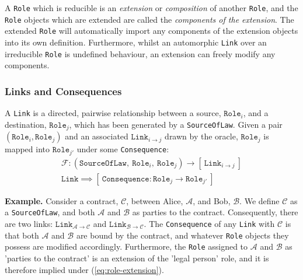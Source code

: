 \documentclass{article}
\numberwithin{equation}{section}
\newcommand{\quickexample}[1]{
\begin{tcolorbox}
	\textbf{Example.} #1
\end{tcolorbox}
}
\begin{document}
A \texttt{Role} which is reducible is an \textit{extension} or \textit{composition} of another \texttt{Role}, and the \texttt{Role} objects which are extended are called the \textit{components of the extension}. The extended \texttt{Role} will automatically import any components of the extension objects into its own definition. Furthermore, whilst an automorphic \texttt{Link} over an irreducible \texttt{Role} is undefined behaviour, an extension can freely modify any components.


\subsubsection{Links and Consequences}\label{section:links-and-consequences}

A \texttt{Link} is a directed, pairwise relationship between a source, $\texttt{Role}_i$, and a destination, $\texttt{Role}_j$, which has been generated by a \texttt{SourceOfLaw}. Given a pair $(\texttt{Role}_i, \texttt{Role}_j)$ and an associated $\texttt{Link}_{i \rightarrow j}$ drawn by the oracle, $\texttt{Role}_j$ is mapped into $\texttt{Role}_{j'}$ under some \texttt{Consequence}:
\begin{align}\label{eq:role-extension}
	\mathcal{F} : (\texttt{SourceOfLaw}, \ \texttt{Role}_i, \ \texttt{Role}_j) \rightarrow [ \ \texttt{Link}_{i \rightarrow j} \ ] \\
	\texttt{Link} \implies [ \ \texttt{Consequence} : \texttt{Role}_j \rightarrow \texttt{Role}_{j'} \ ]
\end{align}

\vspace{0.25cm}
\quickexample{
	Consider a contract, $\mathcal{C}$, between Alice, $\mathcal{A}$, and Bob, $\mathcal{B}$. We define $\mathcal{C}$ as a \texttt{SourceOfLaw}, and both $\mathcal{A}$ and $\mathcal{B}$ as parties to the contract. Consequently, there are two links: $\texttt{Link}_{\mathcal{A} \rightarrow \mathcal{C}}$ and $\texttt{Link}_{\mathcal{B} \rightarrow \mathcal{C}}$. The \texttt{Consequence} of any \texttt{Link} with $\mathcal{C}$ is that both $\mathcal{A}$ and $\mathcal{B}$ are bound by the contract, and whatever \texttt{Role} objects they possess are modified accordingly. Furthermore, the \texttt{Role} assigned to $\mathcal{A}$ and $\mathcal{B}$ as 'parties to the contract' is an extension of the 'legal person' role, and it is therefore implied under (\ref{eq:role-extension}).
}
\end{document}
